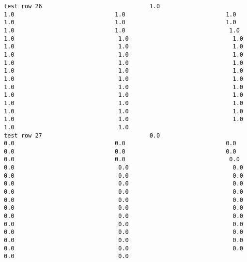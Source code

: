 \documentclass[11pt]{article}
\begin{document}
\begin{verbatim}
test row 26                               1.0                             1.0                             1.0                             1.0                             1.0                             1.0                             1.0                             1.0                             1.0                              1.0                              1.0                              1.0                              1.0                              1.0                              1.0                              1.0                              1.0                              1.0                              1.0                              1.0                              1.0                              1.0                              1.0                              1.0                              1.0                              1.0                              1.0                              1.0                              1.0                              1.0                              1.0                              1.0                              1.0                              1.0                              1.0                              1.0                              1.0                              1.0                              1.0                              1.0                              1.0                              1.0                              1.0                              1.0                              1.0
test row 27                               0.0                             0.0                             0.0                             0.0                             0.0                             0.0                             0.0                             0.0                             0.0                              0.0                              0.0                              0.0                              0.0                              0.0                              0.0                              0.0                              0.0                              0.0                              0.0                              0.0                              0.0                              0.0                              0.0                              0.0                              0.0                              0.0                              0.0                              0.0                              0.0                              0.0                              0.0                              0.0                              0.0                              0.0                              0.0                              0.0                              0.0                              0.0                              0.0                              0.0                              0.0                              0.0                              0.0                              0.0                              0.0

\end{verbatim}
\end{document}
